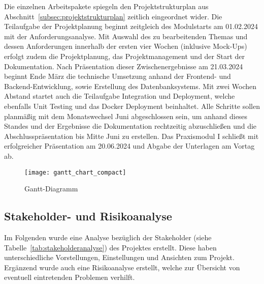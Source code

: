 Die einzelnen Arbeitspakete spiegeln den Projektstrukturplan aus Abschnitt~\ref{subsec:projektstrukturplan} zeitlich eingeordnet wider.
Die Teilaufgabe der Projektplanung beginnt zeitgleich des Modulstarts am 01.02.2024 mit der Anforderungsanalyse.
Mit Auswahl des zu bearbeitenden Themas und dessen Anforderungen innerhalb der ersten vier Wochen (inklusive Mock-Ups) erfolgt zudem die Projektplanung, das Projektmanagement und der Start der Dokumentation.
Nach Präsentation dieser Zwischenergebnisse am 21.03.2024 beginnt Ende März die technische Umsetzung anhand der Frontend- und Backend-Entwicklung, sowie Erstellung des Datenbanksystems.
Mit zwei Wochen Abstand startet auch die Teilaufgabe Integration und Deployment, welche ebenfalls Unit Testing und das Docker Deployment beinhaltet.
Alle Schritte sollen planmäßig mit dem Monatswechsel Juni abgeschlossen sein, um anhand dieses Standes und der Ergebnisse die Dokumentation rechtzeitig abzuschließen und die Abschlusspräsentation bis Mitte Juni zu erstellen.
Das Praxismodul I schließt mit erfolgreicher Präsentation am 20.06.2024 und Abgabe der Unterlagen am Vortag ab.

\begin{figure}[H]
    \centering
    \texttt{[image: gantt\_chart\_compact]}
    \caption{Gantt-Diagramm}\label{fig:gantt-diagramm}
\end{figure}

\newpage

\subsection{Stakeholder- und Risikoanalyse}\label{subsec:Stakeholder-Risikoanalyse}
Im Folgenden wurde eine Analyse bezüglich der Stakeholder (siehe Tabelle~\ref{tab:stakeholderanalyse}) des Projektes erstellt.
Diese haben unterschiedliche Vorstellungen, Einstellungen und Ansichten zum Projekt.
Ergänzend wurde auch eine Risikoanalyse erstellt, welche zur Übersicht von eventuell eintretenden Problemen verhilft. \par


